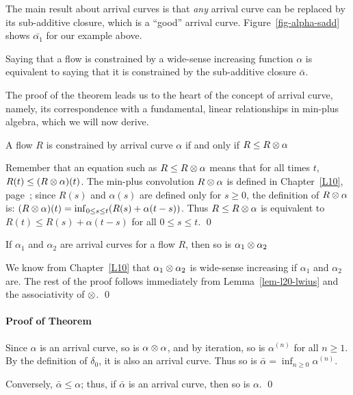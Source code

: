 The main result about arrival curves is that {\em any} arrival curve
can be replaced by its sub-additive closure, which is a ``good'' arrival
curve. Figure~\ref{fig-alpha-sadd} shows $\bar{\alpha_{1}}$ for our example
above.
\begin{theorem} Saying that a flow is constrained by a
    wide-sense increasing function $\alpha$ is equivalent to saying that
    it is constrained by the sub-additive closure $\bar{\alpha}$.
\end{theorem}
The proof of the theorem leads us to the heart of the concept of
arrival curve, namely, its correspondence with  a fundamental,
linear relationships in min-plus algebra, which we will now
derive.
\begin{lemma}
    A flow $R$ is constrained by arrival curve $\alpha$ if and only if
    $R \leq R \otimes \alpha$
\end{lemma}
\pr Remember that an equation such as $R \leq R \otimes \alpha$ means
that for all times $t$, $R(t) \leq (R \otimes \alpha)(t)$.  The
min-plus convolution $R \otimes \alpha$ is defined in
Chapter~\ref{L10}, page~\pageref{def:minplusconvolution}; since
$R(s)$ and $\alpha(s)$ are defined only for $s \geq 0$, the
definition of $R \otimes \alpha$ is: $(R \otimes \alpha)(t) = \inf_{0
\leq s \leq t} (R(s) + \alpha(t-s))$. Thus $R \leq R \otimes \alpha$
is equivalent to $R(t) \leq R(s) + \alpha(t-s)$ for all $0 \leq s
\leq t$. \qed
\begin{lemma}
    If $\alpha_{1}$ and
    $\alpha_{2}$ are arrival curves for a flow $R$, then so is
    $\alpha_{1} \otimes \alpha_{2}$
\end{lemma}
\pr We know from Chapter~\ref{L10} that $\alpha_{1}
\otimes \alpha_{2}$ is wide-sense increasing if $\alpha_{1}$ and
$\alpha_{2}$ are.  The rest of the proof follows immediately from
Lemma~\ref{lem-l20-lwius} and the associativity of $\otimes$.
\qed
\paragraph{Proof of Theorem}
Since $\alpha$ is an arrival curve, so is $\alpha \otimes \alpha$,
and by iteration, so is $\alpha^{(n)}$ for all $n \geq 1$. By the
definition of $\delta_{0}$, it is also an arrival curve. Thus so
is $\bar{\alpha}=\inf_{n\geq 0}\alpha^{(n)}$.

Conversely, $\bar{\alpha} \leq \alpha$; thus, if $\bar{\alpha}$ is
an arrival curve, then so is $\alpha$. \qed

